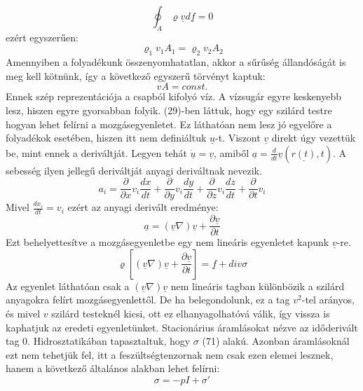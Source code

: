 \documentclass[a4paper,12pt]{article}
\begin{document}
\begin{equation}
\oint_A\varrho\underline{v}d\underline{f}=0
\end{equation}
ezért egyszerűen:
\begin{equation}
\varrho_1v_1A_1=\varrho_2v_2A_2
\end{equation}
Amennyiben a folyadékunk összenyomhatatlan, akkor a sűrűség állandóságát is meg kell kötnünk, így a következő egyszerű törvényt kaptuk:
\begin{equation}
vA=const.
\end{equation}
Ennek szép reprezentációja a csapból kifolyó víz. A vízsugár egyre keskenyebb lesz, hiszen egyre gyorsabban folyik.
(29)-ben láttuk, hogy egy szilárd testre hogyan lehet felírni a mozgásegyenletet. Ez láthatóan nem lesz jó egyelőre a folyadékok esetében, hiszen itt nem definiáltuk $\underline{u}$-t. Viszont $\underline{v}$ direkt úgy vezettük be, mint ennek a deriváltját. Legyen tehát $\dot{\underline{u}}=\underline{v}$, amiből $\underline{a}=\frac{d}{dt}\underline{v}(\underline{r(t)},t)$. A sebesség ilyen jellegű deriváltját anyagi deriváltnak nevezik.
\begin{equation}
a_i=\frac{\partial}{\partial x}v_i\frac{dx}{dt}+\frac{\partial}{\partial y}v_i\frac{dy}{dt}+\frac{\partial}{\partial z}v_i\frac{dz}{dt}+\frac{\partial}{\partial t}v_i
\end{equation}
Mivel $\frac{dx_i}{dt}=v_i$ ezért az anyagi derivált eredménye:
\begin{equation}
\underline{a}=(\underline{v}\nabla)\underline{v}+\frac{\partial\underline{v}}{\partial t}
\end{equation}
Ezt behelyettesítve a mozgásegyenletbe egy nem lineáris egyenletet kapunk $\underline{v}$-re.
\begin{equation}
\varrho\left[(\underline{v}\nabla)\underline{v}+\frac{\partial\underline{v}}{\partial t}\right]=\underline{f}+div\sigma
\end{equation}
Az egyenlet láthatóan csak a $(\underline{v}\nabla)\underline{v}$ nem lineáris tagban különbözik a szilárd anyagokra felírt mozgásegyenlettől. De ha belegondolunk, ez a tag $v^2$-tel arányos, és mivel $v$ szilárd testeknél kicsi, ott ez elhanyagolhatóvá válik, így vissza is kaphatjuk az eredeti egyenletünket.
Stacionárius áramlásokat nézve az időderivált tag 0. Hidrosztatikában tapasztaltuk, hogy $\sigma$ (71) alakú. Azonban áramlásoknál ezt nem tehetjük fel, itt a feszültségtenzornak nem csak ezen elemei lesznek, hanem a következő általános alakban lehet felírni:
\begin{equation}
\sigma=-pI+\sigma'
\end{equation}
\end{document}
